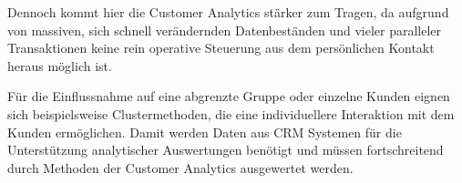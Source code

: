 Dennoch kommt hier die Customer Analytics stärker zum Tragen, da aufgrund von massiven, sich schnell verändernden Datenbeständen und vieler paralleler Transaktionen keine rein operative Steuerung aus dem persönlichen Kontakt heraus möglich ist.

Für die Einflussnahme auf eine abgrenzte Gruppe oder einzelne Kunden eignen sich beispielsweise Clustermethoden, die eine individuellere Interaktion mit dem Kunden ermöglichen. Damit werden Daten aus CRM Systemen für die Unterstützung analytischer Auswertungen benötigt und müssen fortschreitend durch Methoden der Customer Analytics ausgewertet werden. \cite{aichele2016}
